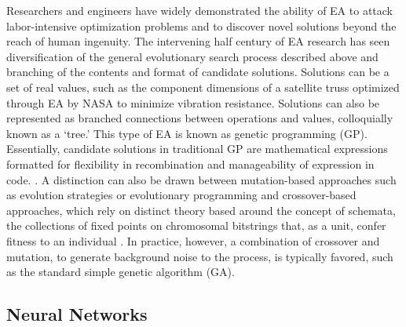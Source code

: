 \documentclass[a4paper]{article}
\begin{document}
Researchers and engineers have widely demonstrated the ability of EA to attack labor-intensive optimization problems and to discover novel solutions beyond the reach of human ingenuity. The intervening half century of EA research has seen diversification of the general evolutionary search process described above and branching of the contents and format of candidate solutions. Solutions can be a set of real values, such as the component dimensions of a satellite truss optimized through EA by NASA to minimize vibration resistance. Solutions can also be represented as branched connections between operations and values, colloquially known as a ‘tree.’ This type of EA is known as genetic programming (GP). Essentially, candidate solutions in traditional GP are mathematical expressions formatted for flexibility in recombination and manageability of expression in code. \cite{Poli2008AProgramming}. A distinction can also be drawn between mutation-based approaches such as evolution strategies or evolutionary programming and crossover-based approaches, which rely on distinct theory based around the concept of schemata, the collections of fixed points on chromosomal bitstrings that, as a unit, confer fitness to an individual \cite{2006RepresentationsAlgorithms}. In practice, however, a combination of crossover and mutation, to generate background noise to the process, is typically favored, such as the standard simple genetic algorithm (GA).

\subsection{Neural Networks}
\end{document}
